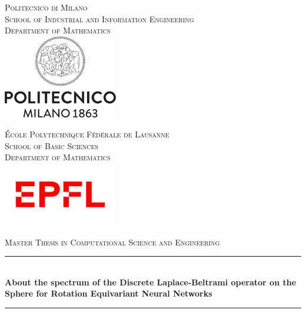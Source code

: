 
\begin{titlepage}
\newcommand{\HRule}{\rule{\linewidth}{1mm}} %
\begin{minipage}[t]{.49\textwidth}
	\raggedleft
	\center
	\textsc{\footnotesize Politecnico di Milano}\\
	\textsc{ \scriptsize School of Industrial and Information Engineering}\\
	\textsc{\scriptsize Department of Mathematics}\\[0.5cm]
	\includegraphics[width=5cm]{figs/cover/polimi.png}
\end{minipage}
\hfill
%
\begin{minipage}[t]{.49\textwidth}
	\raggedright
	\center
	\textsc{\footnotesize \'Ecole Polytechnique F\'ed\'erale de Lausanne}\\
	\textsc{\scriptsize School of Basic Sciences}\\
	\textsc{\scriptsize Department of Mathematics}\\[0.8cm]
	\includegraphics[width=5cm]{figs/cover/EPFL.jpg}
\end{minipage}
\center %
\vspace{1cm}

\textsc{\large Master Thesis in Computational Science and Engineering}\\[1cm]

\HRule \\[0.4cm]
{ \LARGE \bfseries About the spectrum of the Discrete Laplace-Beltrami operator on the Sphere for Rotation Equivariant Neural Networks}\\[0.4cm] 
\HRule \\[1.5cm]     
\vfill 


\end{titlepage}
